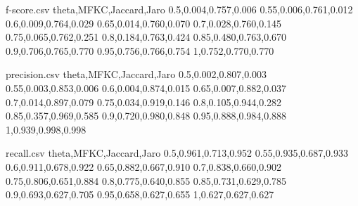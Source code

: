 \begin{filecontents*}{f-score.csv}
theta,MFKC,Jaccard,Jaro
0.5,0.004,0.757,0.006
0.55,0.006,0.761,0.012
0.6,0.009,0.764,0.029
0.65,0.014,0.760,0.070
0.7,0.028,0.760,0.145
0.75,0.065,0.762,0.251
0.8,0.184,0.763,0.424
0.85,0.480,0.763,0.670
0.9,0.706,0.765,0.770
0.95,0.756,0.766,0.754
1,0.752,0.770,0.770
\end{filecontents*}
\begin{filecontents*}{precision.csv}
theta,MFKC,Jaccard,Jaro
0.5,0.002,0.807,0.003
0.55,0.003,0.853,0.006
0.6,0.004,0.874,0.015
0.65,0.007,0.882,0.037
0.7,0.014,0.897,0.079
0.75,0.034,0.919,0.146
0.8,0.105,0.944,0.282
0.85,0.357,0.969,0.585
0.9,0.720,0.980,0.848
0.95,0.888,0.984,0.888
1,0.939,0.998,0.998
\end{filecontents*}
\begin{filecontents*}{recall.csv}
theta,MFKC,Jaccard,Jaro
0.5,0.961,0.713,0.952
0.55,0.935,0.687,0.933
0.6,0.911,0.678,0.922
0.65,0.882,0.667,0.910
0.7,0.838,0.660,0.902
0.75,0.806,0.651,0.884
0.8,0.775,0.640,0.855
0.85,0.731,0.629,0.785
0.9,0.693,0.627,0.705
0.95,0.658,0.627,0.655
1,0.627,0.627,0.627
\end{filecontents*}

